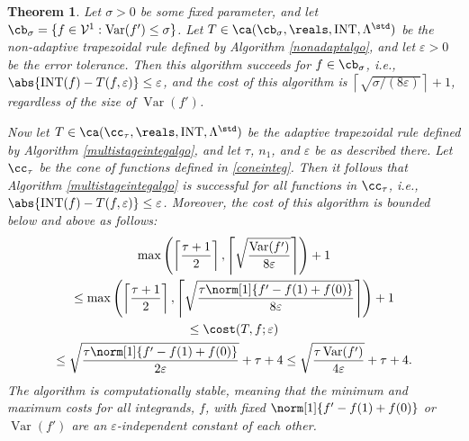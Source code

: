 \documentclass{iitthesis}
\DeclareMathOperator{\Var}{Var}
\DeclareMathOperator{\INT}{INT}
\newtheorem{theorem}{Theorem}
\theoremstyle{definition}
\theoremstyle{remark}
\begin{document}
\begin{theorem} \label{multistageintegthm}
Let $\sigma >0$ be some fixed parameter, and let $\cb_{\sigma}=\{f \in  \mathcal{V}^{1} : \Var(f')\leq \sigma\}$. Let $T \in \ca(\cb_{\sigma}, \reals, \INT, \Lambda^{\std})$ be the non-adaptive trapezoidal rule defined by Algorithm \ref{nonadaptalgo}, and let $\varepsilon>0$ be the error tolerance. Then this algorithm succeeds for $f \in \cb_{\sigma}$, i.e., $\abs{\INT(f) - T(f,\varepsilon)} \le \varepsilon$, and the cost of this algorithm is $\left \lceil \sqrt{\sigma/(8\varepsilon)}\right \rceil + 1$, regardless of the size of $\Var(f')$.

Now let $T \in \ca(\cc_{\tau}, \reals, \INT, \Lambda^{\std})$ be the adaptive trapezoidal rule defined by Algorithm \ref{multistageintegalgo}, and let $\tau$, $n_1$, and $\varepsilon$ be as described there. Let $\cc_\tau$ be the cone of functions defined in \eqref{coneinteg}.  Then it follows that Algorithm \ref{multistageintegalgo} is successful for all functions in $\cc_{\tau}$,  i.e.,  $\abs{\INT(f) - T(f,\varepsilon)} \le \varepsilon$.  Moreover, the cost of this algorithm is bounded below and above as follows:
\begin{multline}
\max \left(\left \lceil\frac{\tau+1}{2} \right \rceil, \left \lceil \sqrt{\frac{ \Var(f')}{8\varepsilon}} \right \rceil \right) +1 \\
\le \max \left(\left \lceil\frac{\tau+1}{2} \right \rceil, \left \lceil \sqrt{\frac{\tau \norm[1]{f'-f(1)+f(0)}}{8\varepsilon}} \right \rceil \right) +1 \\
\le
\cost(T,f;\varepsilon) \\
\le \sqrt{\frac{\tau \norm[1]{f'-f(1)+f(0)}}{2\varepsilon}} + \tau + 4
\le \sqrt{\frac{\tau \Var(f') }{4\varepsilon}} + \tau + 4.
\end{multline}
The algorithm is computationally stable, meaning that the minimum and maximum costs for all integrands, $f$, with fixed $\norm[1]{f'-f(1)+f(0)}$ or $\Var(f')$ are an $\varepsilon$-independent constant of each other.
\end{theorem}

\end{document}
